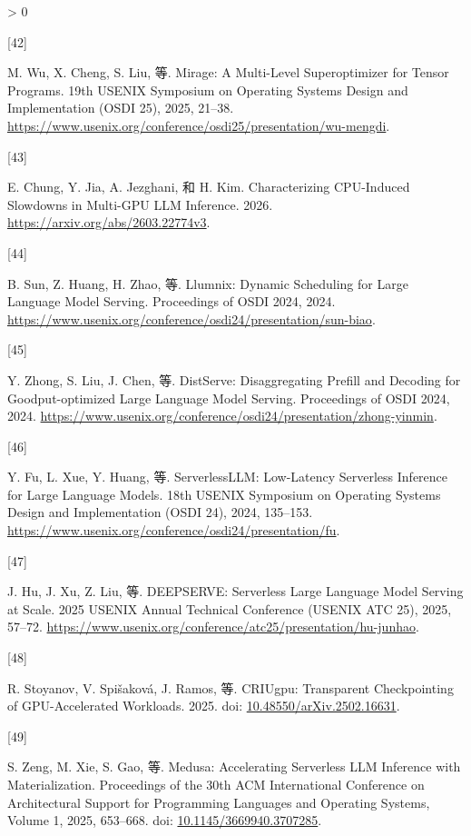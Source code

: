 \documentclass[
  UTF8,
  zihao=5]{ctexart}
\newlength{\cslhangindent}
\newlength{\csllabelwidth}
\newenvironment{CSLReferences}[2] %
 {%
  \setlength{\parindent}{0pt}
  \ifodd #1 \everypar{\setlength{\hangindent}{\cslhangindent}}\ignorespaces\fi
  \ifnum #2 > 0
  \setlength{\parskip}{#2\baselineskip}
  \fi
 }%
 {}
\newcommand{\CSLLeftMargin}[1]{\parbox[t]{\csllabelwidth}{#1}}
\newcommand{\CSLRightInline}[1]{\parbox[t]{\linewidth - \csllabelwidth}{#1}\par}
\begin{document}
\begin{CSLReferences}{0}{0}
\leavevmode{}%
\CSLLeftMargin{{[}42{]} }%
\CSLRightInline{M. Wu, X. Cheng, S. Liu, 等. Mirage: A Multi-Level
Superoptimizer for Tensor Programs. 19th USENIX Symposium on Operating
Systems Design and Implementation (OSDI 25), 2025, 21--38.
\url{https://www.usenix.org/conference/osdi25/presentation/wu-mengdi}.}

\leavevmode{}%
\CSLLeftMargin{{[}43{]} }%
\CSLRightInline{E. Chung, Y. Jia, A. Jezghani, 和 H. Kim. Characterizing
CPU-Induced Slowdowns in Multi-GPU LLM Inference. 2026.
\url{https://arxiv.org/abs/2603.22774v3}.}

\leavevmode{}%
\CSLLeftMargin{{[}44{]} }%
\CSLRightInline{B. Sun, Z. Huang, H. Zhao, 等. Llumnix: Dynamic
Scheduling for Large Language Model Serving. Proceedings of OSDI 2024,
2024.
\url{https://www.usenix.org/conference/osdi24/presentation/sun-biao}.}

\leavevmode{}%
\CSLLeftMargin{{[}45{]} }%
\CSLRightInline{Y. Zhong, S. Liu, J. Chen, 等. DistServe: Disaggregating
Prefill and Decoding for Goodput-optimized Large Language Model Serving.
Proceedings of OSDI 2024, 2024.
\url{https://www.usenix.org/conference/osdi24/presentation/zhong-yinmin}.}

\leavevmode{}%
\CSLLeftMargin{{[}46{]} }%
\CSLRightInline{Y. Fu, L. Xue, Y. Huang, 等. ServerlessLLM: Low-Latency
Serverless Inference for Large Language Models. 18th USENIX Symposium on
Operating Systems Design and Implementation (OSDI 24), 2024, 135--153.
\url{https://www.usenix.org/conference/osdi24/presentation/fu}.}

\leavevmode{}%
\CSLLeftMargin{{[}47{]} }%
\CSLRightInline{J. Hu, J. Xu, Z. Liu, 等. DEEPSERVE: Serverless Large
Language Model Serving at Scale. 2025 USENIX Annual Technical Conference
(USENIX ATC 25), 2025, 57--72.
\url{https://www.usenix.org/conference/atc25/presentation/hu-junhao}.}

\leavevmode{}%
\CSLLeftMargin{{[}48{]} }%
\CSLRightInline{R. Stoyanov, V. Spišaková, J. Ramos, 等. CRIUgpu:
Transparent Checkpointing of GPU-Accelerated Workloads. 2025. doi:
\href{https://doi.org/10.48550/arXiv.2502.16631}{10.48550/arXiv.2502.16631}.}

\leavevmode{}%
\CSLLeftMargin{{[}49{]} }%
\CSLRightInline{S. Zeng, M. Xie, S. Gao, 等. Medusa: Accelerating
Serverless LLM Inference with Materialization. Proceedings of the 30th
ACM International Conference on Architectural Support for Programming
Languages and Operating Systems, Volume 1, 2025, 653--668. doi:
\href{https://doi.org/10.1145/3669940.3707285}{10.1145/3669940.3707285}.}


\end{CSLReferences}
\end{document}
